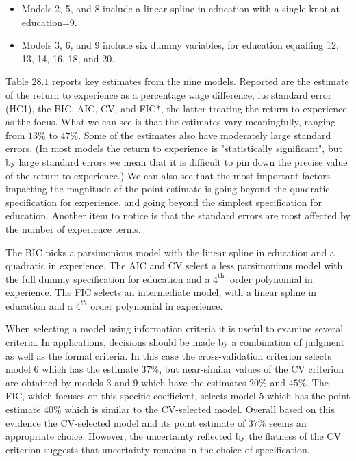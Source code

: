 \documentclass[10pt]{article}
\begin{document}
\begin{itemize}
  \item Models 2, 5, and 8 include a linear spline in education with a single knot at education=9.

  \item Models 3, 6, and 9 include six dummy variables, for education equalling 12, 13, 14, 16, 18, and 20.

\end{itemize}
Table $28.1$ reports key estimates from the nine models. Reported are the estimate of the return to experience as a percentage wage difference, its standard error (HC1), the BIC, AIC, CV, and FIC*, the latter treating the return to experience as the focus. What we can see is that the estimates vary meaningfully, ranging from $13 \%$ to $47 \%$. Some of the estimates also have moderately large standard errors. (In most models the return to experience is "statistically significant", but by large standard errors we mean that it is difficult to pin down the precise value of the return to experience.) We can also see that the most important factors impacting the magnitude of the point estimate is going beyond the quadratic specification for experience, and going beyond the simplest specification for education. Another item to notice is that the standard errors are most affected by the number of experience terms.

The BIC picks a parsimonious model with the linear spline in education and a quadratic in experience. The AIC and CV select a less parsimonious model with the full dummy specification for education and a $4^{\text {th }}$ order polynomial in experience. The FIC selects an intermediate model, with a linear spline in education and a $4^{t h}$ order polynomial in experience.

When selecting a model using information criteria it is useful to examine several criteria. In applications, decisions should be made by a combination of judgment as well as the formal criteria. In this case the cross-validation criterion selects model 6 which has the estimate $37 \%$, but near-similar values of the CV criterion are obtained by models 3 and 9 which have the estimates $20 \%$ and $45 \%$. The FIC, which focuses on this specific coefficient, selects model 5 which has the point estimate $40 \%$ which is similar to the CV-selected model. Overall based on this evidence the CV-selected model and its point estimate of $37 \%$ seems an appropriate choice. However, the uncertainty reflected by the flatness of the CV criterion suggests that uncertainty remains in the choice of specification.
\end{document}
